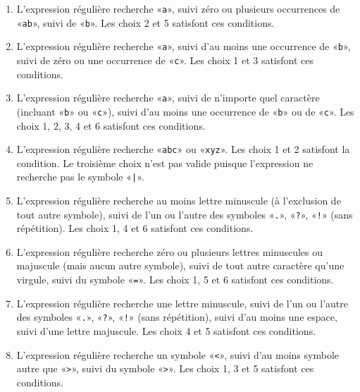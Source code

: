\begin{exercice}
  \begin{sol}
    \begin{enumerate}
    \item L'expression régulière recherche «\verb=a=», suivi zéro ou
      plusieurs occurrences de «\verb=ab=», suivi de «\verb=b=». Les
      choix 2 et 5 satisfont ces conditions.
    \item L'expression régulière recherche «\verb=a=», suivi d'au
      moins une occurrence de «\verb=b=», suivi de zéro ou une
      occurrence de «\verb=c=». Les choix 1 et 3 satisfont ces
      conditions.
    \item L'expression régulière recherche «\verb=a=», suivi de
      n'importe quel caractère (incluant «\verb=b=» ou «\verb=c=»),
      suivi d'au moins une occurrence de «\verb=b=» ou de «\verb=c=».
      Les choix 1, 2, 3, 4 et 6 satisfont ces conditions.
    \item L'expression régulière recherche «\verb=abc=» ou
      «\verb=xyz=». Les choix 1 et 2 satisfont la condition. Le
      troisième choix n'est pas valide puisque l'expression ne
      recherche pas le symbole «\verb=|=».
    \item L'expression régulière recherche au moins lettre minuscule
      (à l'exclusion de tout autre symbole), suivi de l'un ou l'autre
      des symboles «\verb=.=», «\verb=?=», «\verb=!=» (sans
      répétition). Les choix 1, 4 et 6 satisfont ces conditions.
    \item L'expression régulière recherche zéro ou plusieurs lettres
      minuscules ou majuscule (mais aucun autre symbole), suivi de
      tout autre caractère qu'une virgule, suivi du symbole
      «\verb|=|». Les choix 1, 5 et 6 satisfont ces conditions.
    \item L'expression régulière recherche une lettre minuscule, suivi
      de l'un ou l'autre des symboles «\verb=.=», «\verb=?=»,
      «\verb=!=» (sans répétition), suivi d'au moins une espace, suivi
      d'une lettre majuscule. Les choix 4 et 5 satisfont ces
      conditions.
    \item L'expression régulière recherche un symbole «\verb=<=»,
      suivi d'au moins symbole autre que «\verb=>=», suivi du symbole
      «\verb=>=». Les choix 1, 3 et 5 satisfont ces conditions.
    \end{enumerate}
  \end{sol}
\end{exercice}

